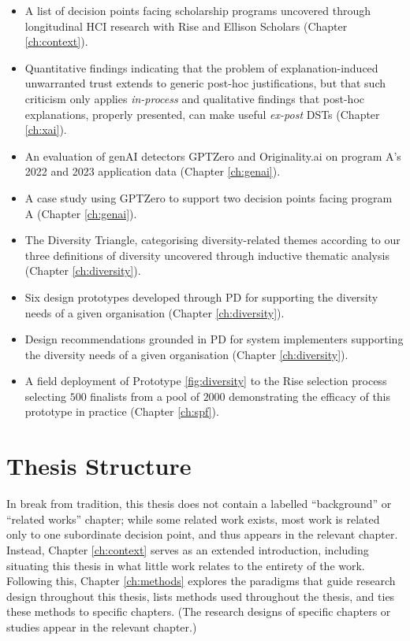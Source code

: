 \begin{itemize}
    \item A list of decision points facing scholarship programs uncovered through longitudinal HCI research with Rise and Ellison Scholars (Chapter \ref{ch:context}).
    \item Quantitative findings indicating that the problem of explanation-induced unwarranted trust extends to generic post-hoc justifications, but that such criticism only applies \emph{in-process} and qualitative findings that post-hoc explanations, properly presented, can make useful \emph{ex-post} DSTs (Chapter \ref{ch:xai}).
    \item An evaluation of genAI detectors GPTZero and Originality.ai on program A's 2022 and 2023 application data (Chapter \ref{ch:genai}).
    \item A case study using GPTZero to support two decision points facing program A (Chapter \ref{ch:genai}).
    \item The Diversity Triangle, categorising diversity-related themes according to our three definitions of diversity uncovered through inductive thematic analysis (Chapter \ref{ch:diversity}).
    \item Six design prototypes developed through PD for supporting the diversity needs of a given organisation (Chapter \ref{ch:diversity}).
    \item Design recommendations grounded in PD for system implementers supporting the diversity needs of a given organisation (Chapter \ref{ch:diversity}).
    \item A field deployment of Prototype \ref{fig:diversity} to the Rise selection process selecting $500$ finalists from a pool of $2000$ demonstrating the efficacy of this prototype in practice (Chapter \ref{ch:spf}).
\end{itemize}

\section{Thesis Structure}
In break from tradition, this thesis does not contain a labelled ``background'' or ``related works'' chapter; while some related work exists, most work is related only to one subordinate decision point, and thus appears in the relevant chapter. Instead, Chapter \ref{ch:context} serves as an extended introduction, including situating this thesis in what little work relates to the entirety of the work. Following this, Chapter \ref{ch:methods} explores the paradigms that guide research design throughout this thesis, lists methods used throughout the thesis, and ties these methods to specific chapters. (The research designs of specific chapters or studies appear in the relevant chapter.)

